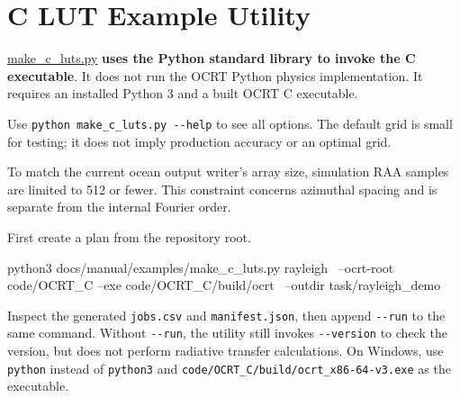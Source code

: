 \chapter{C LUT Example Utility}
\label{chap:examples_readme}
\begingroup
\fontsize{10}{12}\selectfont
\setlength{\parskip}{3pt}
\renewcommand{\TableFont}{\fontsize{8.5}{11}\selectfont}
\renewcommand{\arraystretch}{1.08}
\href{https://github.com/brtnt/OCRT/blob/main/docs/manual/examples/make_c_luts.py}{make\_c\_luts.py} \textbf{uses the Python standard library to invoke the C executable}. It does not run the OCRT Python physics implementation. It requires an installed Python 3 and a built OCRT C executable.

Use \texttt{python make\_\allowbreak{}c\_\allowbreak{}luts.\allowbreak{}py -\allowbreak{}-\allowbreak{}help} to see all options. The default grid is small for testing; it does not imply production accuracy or an optimal grid.

To match the current ocean output writer's array size, simulation RAA samples are limited to 512 or fewer. This constraint concerns azimuthal spacing and is separate from the internal Fourier order.

First create a plan from the repository root.


\begin{ManualCode}
python3 docs/manual/examples/make_c_luts.py rayleigh \
  --ocrt-root code/OCRT_C --exe code/OCRT_C/build/ocrt \
  --outdir task/rayleigh_demo
\end{ManualCode}

Inspect the generated \texttt{jobs.\allowbreak{}csv} and \texttt{manifest.\allowbreak{}json}, then append \texttt{-\allowbreak{}-\allowbreak{}run} to the same command. Without \texttt{-\allowbreak{}-\allowbreak{}run}, the utility still invokes \texttt{-\allowbreak{}-\allowbreak{}version} to check the version, but does not perform radiative transfer calculations. On Windows, use \texttt{python} instead of \texttt{python3} and \texttt{code/\allowbreak{}OCRT\_\allowbreak{}C/\allowbreak{}build/\allowbreak{}ocrt\_\allowbreak{}x86-\allowbreak{}64-\allowbreak{}v3.\allowbreak{}exe} as the executable.


